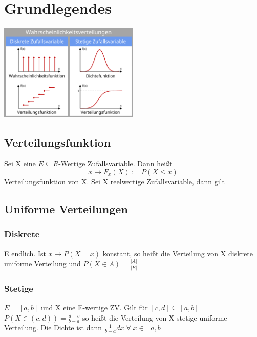 \documentclass{report}
\begin{document}
\section*{Grundlegendes}

\begin{center}
    \includegraphics[width=0.5\textwidth]{media/diskretVsStetig.png}
\end{center}

\subsection*{Verteilungsfunktion}
Sei X eine $E \subseteq R$-Wertige Zufallsvariable. Dann heißt \[x \rightarrow F_x(X) := P(X \leq x)\] Verteilungsfunktion von X. Sei X reelwertige Zufallsvariable, dann gilt

\subsection*{Uniforme Verteilungen}
\subsubsection*{Diskrete}
E endlich. Ist $x \rightarrow P(X = x)$ konstant, so heißt die Verteilung von X
diskrete uniforme Verteilung und $P(X \in A) = \frac{|A|}{|E|}$
\subsubsection*{Stetige}
$E = [a, b]$ und X eine E-wertige ZV. Gilt für $[c, d] \subseteq [a, b]$ $P(X \in (c, d)) = \frac{d-c}{b-a}$ so heißt die Verteilung von X stetige uniforme Verteilung. Die Dichte ist dann $\frac{1}{b-a}dx\;\forall\;x \in [a, b]$
\end{document}
